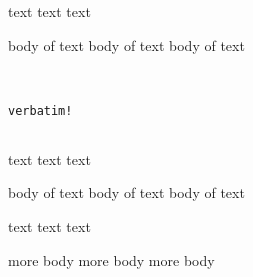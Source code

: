 text text text\begin{myenv}
	body of text
	body of text
	body of text


\end{myenv}


\begin{verbatim}


verbatim!


\end{verbatim}


text text text

\begin{cmh}


	body of text
	body of text
	body of text
\end{cmh}

text text text

\begin{myenv}
	more body
	more body
	more body\end{myenv}

